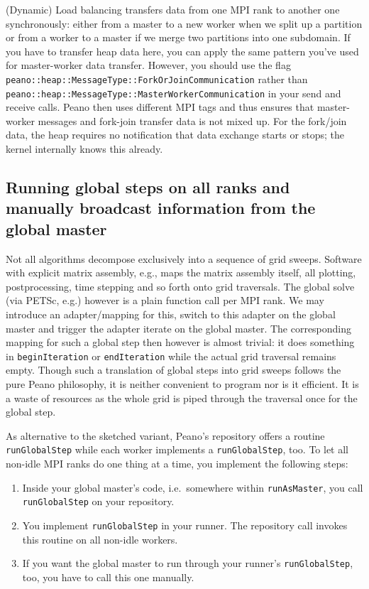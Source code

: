\begin{remark}
(Dynamic) Load balancing transfers data from one MPI rank to another one
synchronously: either from a master to a new worker when we split up a partition
or from a worker to a master if we merge two partitions into one subdomain. If
you have to transfer heap data here, you can apply the same pattern you've used
for master-worker data transfer. However, you should use the flag  
\texttt{peano::heap::MessageType::ForkOrJoinCommunication} rather than 
\texttt{peano::heap::MessageType::MasterWorkerCommunication} in your send and
receive calls.
Peano then uses different MPI tags and thus ensures that master-worker messages and fork-join
transfer data is not mixed up.
For the fork/join data, the heap requires no notification that data exchange
starts or stops; the kernel internally knows this already.
\end{remark}


\subsection{Running global steps on all ranks and manually broadcast
information from the global master}

Not all algorithms decompose exclusively into a sequence of grid sweeps. 
Software with explicit matrix assembly, e.g., maps the matrix assembly itself,
all plotting, postprocessing, time stepping and so forth onto grid traversals.
The global solve (via PETSc, e.g.) however is a plain function call per MPI
rank.
We may introduce an adapter/mapping for this, switch to this adapter on the
global master and trigger the adapter iterate on the global master.
The corresponding mapping for such a global step then however is almost trivial:
it does something in \texttt{beginIteration} or \texttt{endIteration} while the
actual grid traversal remains empty. 
Though such a translation of global steps into grid sweeps follows the pure
Peano philosophy, it is neither convenient to program nor is it efficient.
It is a waste of resources as the whole grid is piped through
the traversal once for the global step.


As alternative to the sketched variant, Peano's repository offers a
routine \texttt{runGlobalStep} while each worker implements a
\texttt{runGlobalStep}, too. 
To let all non-idle MPI ranks do one thing at a time, you implement the
following steps:

\begin{enumerate}
  \item Inside your global master's code, i.e.~somewhere within
  \texttt{runAsMaster}, you call \texttt{runGlobalStep} on your repository.
  \item You implement \texttt{runGlobalStep} in your runner. The repository call
  invokes this routine on all non-idle workers.
  \item If you want the global master to run through your runner's
  \texttt{runGlobalStep}, too, you have to call this one manually.
\end{enumerate}

